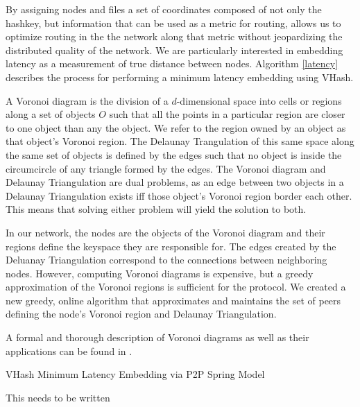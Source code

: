 \documentclass{IEEEtran}
\begin{document}
By assigning nodes and files a set of coordinates composed of not only the hashkey, but information that can be used as a metric for routing,  allows us to optimize routing in the the network along that metric without jeopardizing the distributed quality of the network.  We are particularly interested in embedding latency as a measurement of true distance between nodes.  Algorithm \ref{latency} describes the process for performing a minimum latency embedding using VHash.


A Voronoi diagram is the division of a $d$-dimensional space into cells or regions along a set of objects $O$ such that all the points in a particular region are closer to one object than any the object.  
We refer to the region owned by an object as that object's Voronoi region.
The Delaunay Trangulation of this same space along the same set of objects is defined by the edges such that no object is inside the circumcircle of any triangle formed by the edges\cite{geoalg}.  
The Voronoi diagram and Delaunay Triangulation are dual problems, as an edge between two objects in a Delaunay Triangulation exists iff those object's Voronoi region border each other.  
This means that solving either problem will yield the solution to both. 

In our network, the nodes are the objects of the Voronoi diagram and their regions define the keyspace they are responsible for.  The edges created by the Deluanay Triangulation correspond to the connections between neighboring nodes.  However, computing Voronoi diagrams is expensive, but a greedy approximation of the Voronoi regions is sufficient for the protocol.  We created a new greedy, online algorithm that approximates and maintains the set of peers defining the node's Voronoi region and Delaunay Triangulation.

A formal and thorough description of Voronoi diagrams as well as their applications can be found in \cite{aurenhammer1991voronoi}.





\begin{algorithm}
\caption{VHash Minimum Latency Embedding via P2P Spring Model}
\label{latency}
\begin{algorithmic}[1]  %
	\STATE This needs to be written
\end{algorithmic}
\end{algorithm}
\end{document}
